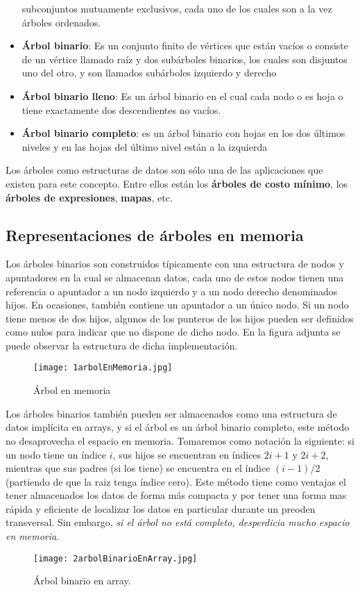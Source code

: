 \begin{itemize}
  subconjuntos mutuamente exclusivos, cada uno de los cuales son a la
  vez árboles ordenados.
\item \textbf{Árbol binario}: Es un conjunto finito de vértices que
  están vacíos o consiste de un vértice llamado raíz y dos subárboles
  binarios, los cuales son disjuntos uno del otro, y son llamados
  subárboles izquierdo y derecho
\item \textbf{Árbol binario lleno}: Es un árbol binario en el cual
  cada nodo o es hoja o tiene exactamente dos descendientes no vacíos.
\item \textbf{Árbol binario completo}: es un árbol binario con hojas
  en los dos últimos niveles y en las hojas del último nivel están a
  la izquierda
\end{itemize}

Los árboles como estructuras de datos son sólo una de las aplicaciones
que existen para este concepto.  Entre ellos están los \textbf{árboles de
costo mínimo}, los \textbf{árboles de expresiones}, \textbf{mapas}, etc.

\subsection{Representaciones de árboles en memoria}
\label{sec:repr-de-arbol}

Los árboles binarios son construidos típicamente con una estructura de
nodos y apuntadores en la cual se almacenan datos, cada uno de estos
nodos tienen una referencia o apuntador a un nodo izquierdo y a un
nodo derecho denominados hijos. En ocasiones, también contiene un
apuntador a un único nodo. Si un nodo tiene menos de dos hijos,
algunos de los punteros de los hijos pueden ser definidos como nulos
para indicar que no dispone de dicho nodo. En la figura adjunta se
puede observar la estructura de dicha implementación.

\begin{figure}[H]
  \centering
  \texttt{[image: 1arbolEnMemoria.jpg]}
  \caption{Árbol en memoria}
  \label{fig:1arbolEnMemoria}
\end{figure}

Los árboles binarios también pueden ser almacenados como una
estructura de datos implícita en arrays, y si el árbol es un árbol
binario completo, este método no desaprovecha el espacio en
memoria. Tomaremos como notación la siguiente: si un nodo tiene un
índice $i$, sus hijos se encuentran en índices $2i+1$ y $2i + 2$,
mientras que sus padres (si los tiene) se encuentra en el índice
$(i-1)/2$ (partiendo de que la raiz tenga índice cero). Este método
tiene como ventajas el tener almacenados los datos de forma más
compacta y por tener una forma mas rápida y eficiente de localizar los
datos en particular durante un preoden transversal. Sin embargo, \textit{si el
árbol no está completo, desperdicia mucho espacio en memoria}.
\begin{figure}[H]
  \centering
  \texttt{[image: 2arbolBinarioEnArray.jpg]}
  \caption{Árbol binario en array.}
  \label{fig:2arbolBinarioEnArray}
\end{figure}

